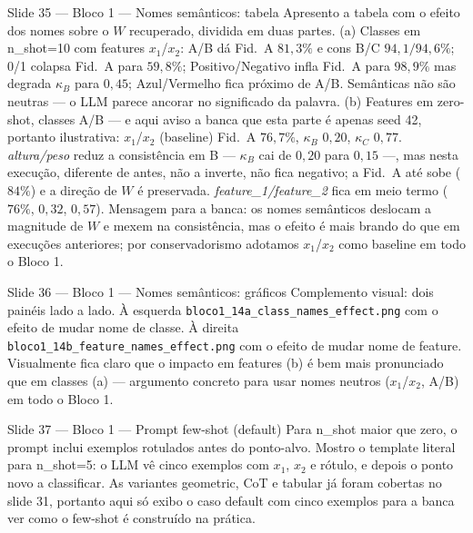 \documentclass[aspectratio=169,10pt]{beamer}
\begin{document}
\begin{frame}{Slide 35 --- Bloco 1 --- Nomes sem\^anticos: tabela}
\footnotesize
Apresento a tabela com o efeito dos nomes sobre o $W$ recuperado, dividida em duas partes. (a) Classes em n\_shot=10 com features $x_1$/$x_2$: A/B d\'a Fid.\ A $81{,}3\%$ e cons B/C $94{,}1/94{,}6\%$; 0/1 colapsa Fid.\ A para $59{,}8\%$; Positivo/Negativo infla Fid.\ A para $98{,}9\%$ mas degrada $\kappa_B$ para $0{,}45$; Azul/Vermelho fica pr\'oximo de A/B. Sem\^anticas n\~ao s\~ao neutras --- o LLM parece ancorar no significado da palavra. (b) Features em zero-shot, classes A/B --- e aqui aviso a banca que esta parte \'e apenas seed 42, portanto ilustrativa: $x_1$/$x_2$ (baseline) Fid.\ A $76{,}7\%$, $\kappa_B$ $0{,}20$, $\kappa_C$ $0{,}77$. \emph{altura/peso} reduz a consist\^encia em B --- $\kappa_B$ cai de $0{,}20$ para $0{,}15$ ---, mas nesta execu\c{c}\~ao, diferente de antes, n\~ao a inverte, n\~ao fica negativo; a Fid.\ A at\'e sobe ($84\%$) e a dire\c{c}\~ao de $W$ \'e preservada. \emph{feature\_1/feature\_2} fica em meio termo ($76\%$, $0{,}32$, $0{,}57$). Mensagem para a banca: os nomes sem\^anticos deslocam a magnitude de $W$ e mexem na consist\^encia, mas o efeito \'e mais brando do que em execu\c{c}\~oes anteriores; por conservadorismo adotamos $x_1$/$x_2$ como baseline em todo o Bloco 1.
\end{frame}

\begin{frame}{Slide 36 --- Bloco 1 --- Nomes sem\^anticos: gr\'aficos}
\footnotesize
Complemento visual: dois pain\'eis lado a lado. \`A esquerda \texttt{bloco1\_14a\_class\_names\_effect.png} com o efeito de mudar nome de classe. \`A direita \texttt{bloco1\_14b\_feature\_names\_effect.png} com o efeito de mudar nome de feature. Visualmente fica claro que o impacto em features (b) \'e bem mais pronunciado que em classes (a) --- argumento concreto para usar nomes neutros ($x_1$/$x_2$, A/B) em todo o Bloco 1.
\end{frame}

\begin{frame}{Slide 37 --- Bloco 1 --- Prompt few-shot (default)}
\footnotesize
Para n\_shot maior que zero, o prompt inclui exemplos rotulados antes do ponto-alvo. Mostro o template literal para n\_shot=5: o LLM v\^e cinco exemplos com $x_1$, $x_2$ e r\'otulo, e depois o ponto novo a classificar. As variantes geometric, CoT e tabular j\'a foram cobertas no slide 31, portanto aqui s\'o exibo o caso default com cinco exemplos para a banca ver como o few-shot \'e constru\'ido na pr\'atica.
\end{frame}
\end{document}
